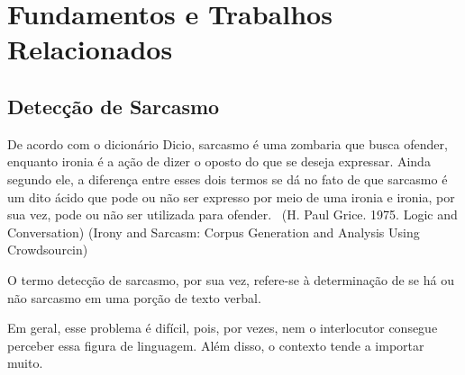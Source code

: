 

\chapter{Fundamentos e Trabalhos Relacionados}%
\label{cha:fundamentos_e_trabalhos_relacionados}

\section{Detecção de Sarcasmo}%
\label{sec:deteccao_de_sarcasmo}

De acordo com o dicionário Dicio, sarcasmo é uma zombaria que busca ofender,
enquanto ironia é a ação de dizer o oposto do que se deseja expressar. Ainda
segundo ele, a diferença entre esses dois termos se dá no fato de que sarcasmo é
um dito ácido que pode ou não ser expresso por meio de uma ironia e ironia, por
sua vez, pode ou não ser utilizada para ofender.~\cite{dicio_sarc, dicio_irony}
(H. Paul Grice. 1975. Logic and Conversation)
(Irony and Sarcasm: Corpus Generation and Analysis Using Crowdsourcin)

O termo detecção de sarcasmo, por sua vez, refere-se à determinação de se há ou
não sarcasmo em uma porção de texto verbal.

Em geral, esse problema é difícil, pois, por vezes, nem o interlocutor consegue
perceber essa figura de linguagem. Além disso, o contexto tende a importar
muito.





